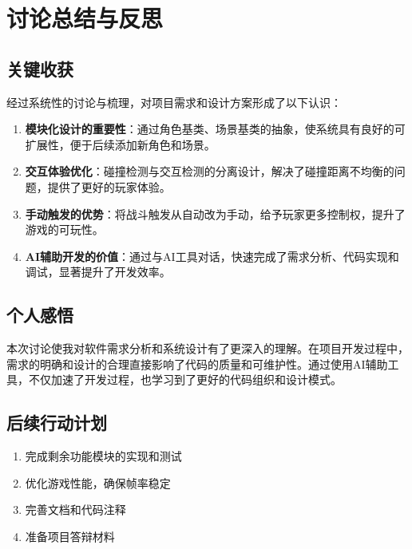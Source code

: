 \documentclass[12pt,a4paper]{article}
\begin{document}
\section{讨论总结与反思}

\subsection{关键收获}

经过系统性的讨论与梳理，对项目需求和设计方案形成了以下认识：

\begin{enumerate}[label=\arabic*.]
    \item \textbf{模块化设计的重要性}：通过角色基类、场景基类的抽象，使系统具有良好的可扩展性，便于后续添加新角色和场景。

    \item \textbf{交互体验优化}：碰撞检测与交互检测的分离设计，解决了碰撞距离不均衡的问题，提供了更好的玩家体验。

    \item \textbf{手动触发的优势}：将战斗触发从自动改为手动，给予玩家更多控制权，提升了游戏的可玩性。

    \item \textbf{AI辅助开发的价值}：通过与AI工具对话，快速完成了需求分析、代码实现和调试，显著提升了开发效率。
\end{enumerate}

\subsection{个人感悟}

本次讨论使我对软件需求分析和系统设计有了更深入的理解。在项目开发过程中，需求的明确和设计的合理直接影响了代码的质量和可维护性。通过使用AI辅助工具，不仅加速了开发过程，也学习到了更好的代码组织和设计模式。

\subsection{后续行动计划}
\begin{enumerate}[label=\arabic*.]
    \item 完成剩余功能模块的实现和测试
    \item 优化游戏性能，确保帧率稳定
    \item 完善文档和代码注释
    \item 准备项目答辩材料
\end{enumerate}
\end{document}
